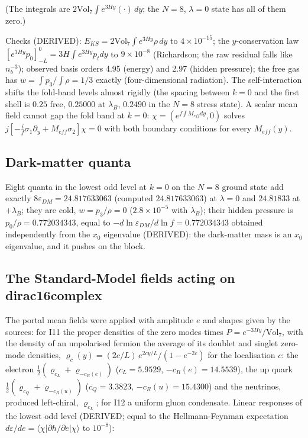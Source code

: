 \documentclass[
  10pt,
]{article}
\begin{document}
(The integrals are \(2\mathrm{Vol}_7\int e^{3Hy}(\cdot)\,dy\); the
\(N = 8\), \(\lambda = 0\) state has all of them zero.)

Checks (DERIVED): \(E_{KS} = 2\mathrm{Vol}_7\int e^{3Hy}\rho\,dy\) to
\(4\times10^{-15}\); the \(y\)-conservation law
\([e^{3Hy}p_0]_{-L}^0 = 3H\int e^{3Hy}p_tdy\) to \(9\times10^{-8}\)
(Richardson; the raw residual falls like \(n_b^{-3}\)); observed basis
orders 4.95 (energy) and 2.97 (hidden pressure); the free gas has
\(w = \int p_3/\int\rho = 1/3\) exactly (four-dimensional radiation).
The self-interaction shifts the fold-band levels almost rigidly (the
spacing between \(k = 0\) and the first shell is \(0.25\) free,
\(0.25000\) at \(\lambda_B\), \(0.2490\) in the \(N = 8\) stress state).
A scalar mean field cannot gap the fold band at \(k = 0\):
\(\chi = (e^{f\int M_{eff}dy}, 0)\) solves
\(j[-\frac{i}{f}\sigma_1\partial_y + M_{eff}\sigma_2]\chi = 0\) with
both boundary conditions for every \(M_{eff}(y)\).

\hypertarget{dark-matter-quanta}{%
\subsection{Dark-matter quanta}\label{dark-matter-quanta}}

Eight quanta in the lowest odd level at \(k = 0\) on the \(N = 8\)
ground state add exactly \(8\varepsilon_{DM} = 24.817633063\) (computed
\(24.817633063\)) at \(\lambda = 0\) and \(24.81833\) at \(+\lambda_B\);
they are cold, \(w = p_3/\rho = 0\) (\(2.8\times10^{-5}\) with
\(\lambda_B\)); their hidden pressure is \(p_0/\rho = 0.772034343\),
equal to \(-d\ln\varepsilon_{DM}/d\ln f = 0.772034343\) obtained
independently from the \(x_0\) eigenvalue (DERIVED): the dark-matter
mass is an \(x_0\) eigenvalue, and it pushes on the block.

\hypertarget{the-standard-model-fields-acting-on-dirac16complex}{%
\subsection{The Standard-Model fields acting on
dirac16complex}\label{the-standard-model-fields-acting-on-dirac16complex}}

The portal mean fields were applied with amplitude \(e\) and shapes
given by the sources: for I11 the proper densities of the zero modes
times \(P = e^{-3Hy}/\mathrm{Vol}_7\), with the density of an
unpolarised fermion the average of its doublet and singlet zero-mode
densities, \(\varrho_c(y) = (2c/L)\,e^{2cy/L}/(1 - e^{-2c})\) for the
localisation \(c\): the electron
\(\frac12(\varrho_{c_L} + \varrho_{-c_R(e)})\) (\(c_L = 5.9529\),
\(-c_R(e) = 14.5539\)), the up quark
\(\frac12(\varrho_{c_Q} + \varrho_{-c_R(u)})\) (\(c_Q = 3.3823\),
\(-c_R(u) = 15.4300\)) and the neutrinos, produced left-chiral,
\(\varrho_{c_L}\); for I12 a uniform gluon condensate. Linear responses
of the lowest odd level (DERIVED; equal to the Hellmann-Feynman
expectation
\(d\varepsilon/de = \langle\chi\vert\partial h/\partial e\vert\chi\rangle\)
to \(10^{-8}\)):
\end{document}
